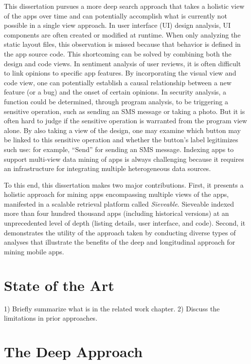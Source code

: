 This dissertation pursues a more deep search approach that takes a holistic view of the apps over time and can potentially accomplish what is currently not possible in a single view approach.
In user interface (UI) design analysis, UI components are often created or modified at runtime.
When only analyzing the static layout files, this observation is missed because that behavior is defined in the app source code.
This shortcoming can be solved by combining both the design and code views.
In sentiment analysis of user reviews, it is often difficult to link opinions to specific app features.
By incorporating the visual view and code view, one can potentially establish a causal relationship between a new feature (or a bug) and the onset of certain opinions.
In security analysis, a function could be determined, through program analysis, to be triggering a sensitive operation, such as sending an SMS message or taking a photo.
But it is often hard to judge if the sensitive operation is warranted from the program view alone.
By also taking a view of the design, one may examine which button may be linked to this sensitive operation and whether the button's label legitimizes such use: for example, ``Send'' for sending an SMS message.
Indexing apps to support multi-view data mining of apps is always challenging because it requires an infrastructure for integrating multiple heterogeneous data sources.

To this end, this dissertation makes two major contributions.
First, it presents a holistic approach for mining apps encompassing multiple views of the apps, manifested in a scalable retrieval platform called \textit{Sieveable}.
Sieveable indexed more than four hundred thousand apps (including historical versions) at an unprecedented level of depth (listing details, user interface, and code).
Second, it demonstrates the utility of the approach taken by conducting diverse types of analyses that illustrate the benefits of the deep and longitudinal approach for mining mobile apps.

\section{State of the Art}

1) Briefly summarize what is in the related work chapter.
2) Discuss the limitations in prior approaches.
\pagebreak

\section{The Deep Approach}

